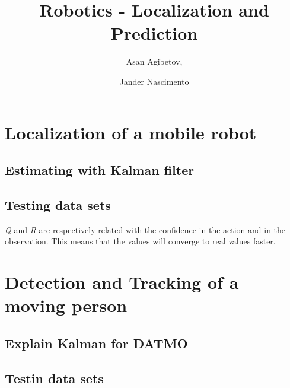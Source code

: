 \documentclass{article}
\begin{document}
\title{Robotics - Localization and Prediction}

\author{Asan Agibetov, 
\and Jander Nascimento}

\maketitle

\section{Localization of a mobile robot}

\subsection{Estimating with Kalman filter}

\subsection{Testing data sets}
\emph{Q} and \emph{R} are respectively related with the confidence in the action and in the observation. This means that the values will converge to real values faster.

\section{Detection and Tracking of a moving person}

\subsection{Explain Kalman for DATMO}

\subsection{Testin data sets}
\end{document}
